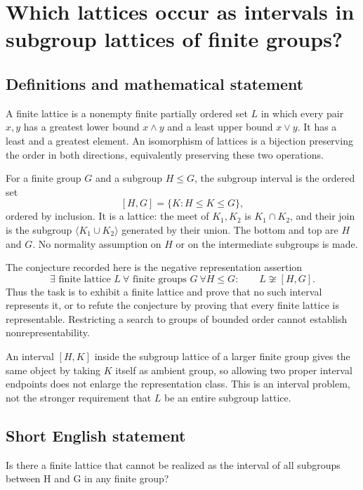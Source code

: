 \documentclass[11pt,a4paper]{article}
\begin{document}
\section*{Which lattices occur as intervals in subgroup lattices of finite groups?}\label{statement}

\subsection{Definitions and mathematical statement}
A finite lattice is a nonempty finite partially ordered set $L$ in
which every pair $x,y$ has a greatest lower bound $x\wedge y$ and
a least upper bound $x\vee y$. It has a least and a greatest element.
An isomorphism of lattices is a bijection preserving the order in
both directions, equivalently preserving these two operations.

For a finite group $G$ and a subgroup $H\le G$, the subgroup interval
is the ordered set
\[
                         [H,G]=\{K:H\le K\le G\},
\]
ordered by inclusion. It is a lattice: the meet of $K_1,K_2$ is
$K_1\cap K_2$, and their join is the subgroup
$\langle K_1\cup K_2\rangle$ generated by their union. The bottom
and top are $H$ and $G$. No normality assumption on $H$ or on the
intermediate subgroups is made.

The conjecture recorded here is the negative representation assertion
\[
 \exists\text{ finite lattice }L\ \forall\text{ finite groups }G
 \ \forall H\le G:\qquad L\not\cong[H,G].
\]
Thus the task is to exhibit a finite lattice and prove that no such
interval represents it, or to refute the conjecture by proving
that every finite lattice is representable. Restricting a search
to groups of bounded order cannot establish nonrepresentability.

An interval $[H,K]$ inside the subgroup lattice of a larger finite
group gives the same object by taking $K$ itself as ambient group,
so allowing two proper interval endpoints does not enlarge the
representation class. This is an interval problem, not the stronger
requirement that $L$ be an entire subgroup lattice.
\subsection{Short English statement}
Is there a finite lattice that cannot be realized as the interval of all subgroups between H and G in any finite group?
\end{document}
